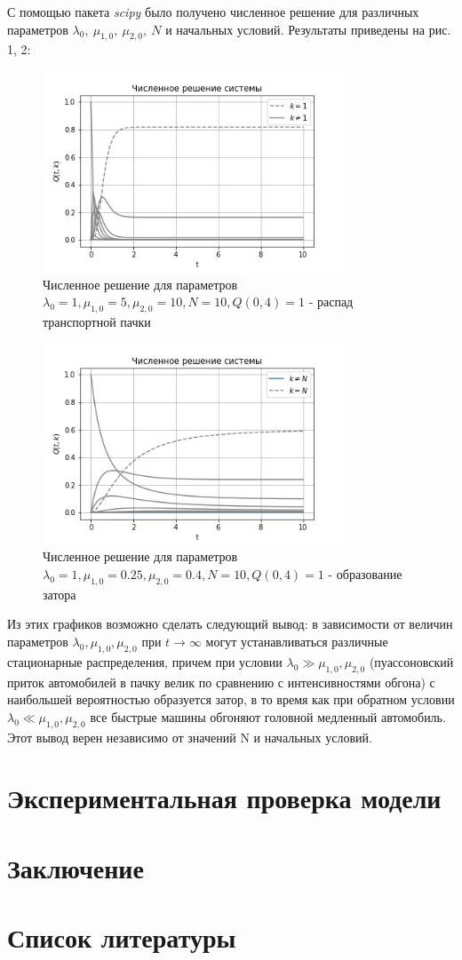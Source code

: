 \documentclass[a4paper, 14pt, russian]{article}
\begin{document}
С помощью пакета \textit{scipy} было получено численное решение для различных параметров $\lambda_0, \ \mu_{1,0}, \ \mu_{2,0}, \ N$ и начальных условий. Результаты приведены на рис. 1, 2:

\begin{figure}[!ht]
\includegraphics[width=0.8\textwidth]{pictures/1.jpg}
\caption{Численное решение для параметров $\lambda_0 = 1, \mu_{1,0} = 5, \mu_{2,0} = 10, N = 10, Q(0, 4) = 1$ - распад транспортной пачки}
\centering
\end{figure}

\begin{figure}[!ht]
\includegraphics[width=0.8\textwidth]{pictures/2.jpg}
\caption{Численное решение для параметров $\lambda_0 = 1, \mu_{1,0} = 0.25, \mu_{2,0} = 0.4, N = 10, Q(0, 4) = 1$ - образование затора}
\centering
\end{figure}

Из этих графиков возможно сделать следующий вывод: в зависимости от величин параметров $\lambda_0, \mu_{1,0}, \mu_{2,0}$ при $t \rightarrow \infty$ могут устанавливаться различные стационарные распределения, причем при условии $\lambda_0 \gg \mu_{1,0}, \mu_{2,0}$ (пуассоновский приток автомобилей в пачку велик по сравнению с интенсивностями обгона) с наибольшей вероятностью образуется затор, в то время как при обратном условии $\lambda_0 \ll \mu_{1,0}, \mu_{2,0}$ все быстрые машины обгоняют головной медленный автомобиль. Этот вывод верен независимо от значений N и начальных условий.
\section{Экспериментальная проверка модели}

\section{Заключение}

\section{Список литературы}
\end{document}
